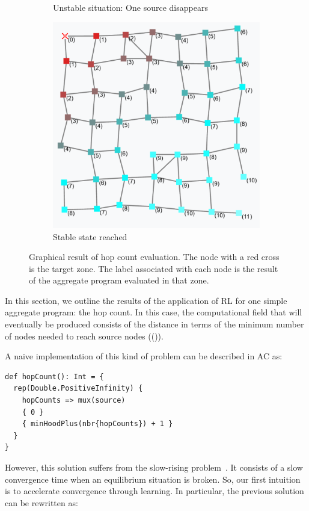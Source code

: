 \documentclass[conference]{IEEEtran}
\begin{document}
\begin{figure}[h]
\begin{subfigure}[b]{0.32\textwidth}
      \caption{Unstable situation: One source disappears}
  \end{subfigure}
  \hfill
  \begin{subfigure}[b]{0.32\textwidth}
      \centering
      \includegraphics[width=\textwidth]{img/hop-count-3.png}
      \caption{Stable state reached}
  \end{subfigure}
  \caption{Graphical result of hop count evaluation. The node with a red cross is the target zone. The label 
  associated with each node is the result of the aggregate program evaluated in that zone.}
  \label{fig:hop-count}
\end{figure}
In this section, we outline the results of the application of RL for one simple
 aggregate program: the hop count. In this case, the computational field that will eventually be produced consists of the distance in terms of the minimum number of nodes needed to reach source nodes (()).

A naive implementation of this kind of problem can be described in AC as:
\begin{verbatim}
def hopCount(): Int = {
  rep(Double.PositiveInfinity) { 
    hopCounts => mux(source) 
    { 0 } 
    { minHoodPlus(nbr{hopCounts}) + 1 }
  }
}
\end{verbatim}
However, this solution suffers from the slow-rising problem~\cite{DBLP:conf/saso/AudritoCDV17}. 
 It consists of a slow convergence time when an equilibrium situation is broken.
So, our first intuition is to accelerate convergence through learning.
 In particular, the previous solution can be rewritten as:
\end{document}
